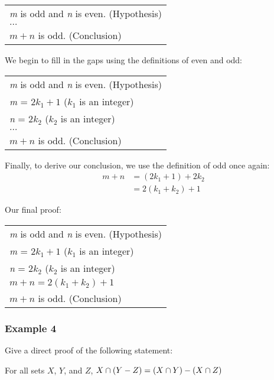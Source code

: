 \begin{table}[h]
\centering
\begin{tabular}{l}
\textit{m} is odd and \textit{n} is even. (Hypothesis)\\
$\dots$\\
$m + n$ is odd. (Conclusion)
\end{tabular}
\end{table}

\clearpage

We begin to fill in the gaps using the definitions of even and odd:

\begin{table}[h]
\centering
\begin{tabular}{l}
\textit{m} is odd and \textit{n} is even. (Hypothesis)\\
\textit{m} = $2k_1 + 1$ ($k_1$ is an integer)\\
\textit{n} = $2k_2$ ($k_2$ is an integer)\\
$\dots$\\
$m + n$ is odd. (Conclusion)
\end{tabular}
\end{table}

Finally, to derive our conclusion, we use the definition of odd once again:
\begin{align*}
    m + n &= (2k_1 + 1) + 2k_2\\
    &= 2(k_1 + k_2) + 1
\end{align*}

Our final proof:

\begin{table}[h]
\centering
\begin{tabular}{l}
\textit{m} is odd and \textit{n} is even. (Hypothesis)\\
\textit{m} = $2k_1 + 1$ ($k_1$ is an integer)\\
\textit{n} = $2k_2$ ($k_2$ is an integer)\\
$m + n = 2(k_1 + k_2) + 1$\\
$m + n$ is odd. (Conclusion)
\end{tabular}
\end{table}

\subsubsection*{Example 4}

Give a direct proof of the following statement:
\begin{center}
    For all sets $X$, $Y$, and $Z$, $X \cap (Y - Z) = (X \cap Y) - (X \cap Z)$
\end{center}

